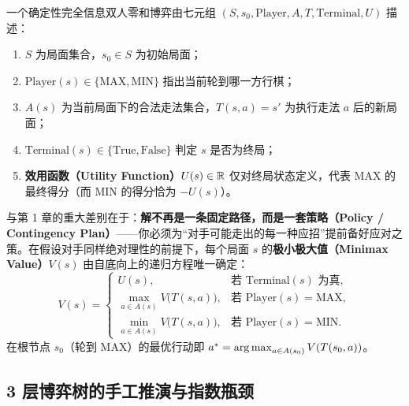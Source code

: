 \begin{defBox}
\begin{definition}[确定性完全信息双人零和博弈]\label{def:game}
一个确定性完全信息双人零和博弈由七元组 $(S, s_0, \text{Player}, A, T, \text{Terminal}, U)$ 描述：
\begin{enumerate}
  \item $S$ 为局面集合，$s_0 \in S$ 为初始局面；
  \item $\text{Player}(s) \in \{\text{MAX}, \text{MIN}\}$ 指出当前轮到哪一方行棋；
  \item $A(s)$ 为当前局面下的合法走法集合，$T(s, a) = s'$ 为执行走法 $a$ 后的新局面；
  \item $\text{Terminal}(s) \in \{\text{True}, \text{False}\}$ 判定 $s$ 是否为终局；
  \item \textbf{效用函数（Utility Function）}$U(s) \in \mathbb{R}$ 仅对终局状态定义，代表 \textsf{MAX} 的最终得分（而 \textsf{MIN} 的得分恰为 $-U(s)$）。
\end{enumerate}
\end{definition}
\end{defBox}

与第 1 章的重大差别在于：\textbf{解不再是一条固定路径，而是一套策略（Policy / Contingency Plan）}——你必须为“对手可能走出的每一种应招”提前备好应对之策。在假设对手同样绝对理性的前提下，每个局面 $s$ 的\textbf{极小极大值（Minimax Value）}$V(s)$ 由自底向上的递归方程唯一确定：
\begin{equation}\label{eq:minimax}
  V(s) =
  \begin{cases}
    U(s), & \text{若 } \text{Terminal}(s) \text{ 为真}, \\[4pt]
    \displaystyle\max_{a \in A(s)} V\bigl(T(s, a)\bigr), & \text{若 } \text{Player}(s) = \text{MAX}, \\[8pt]
    \displaystyle\min_{a \in A(s)} V\bigl(T(s, a)\bigr), & \text{若 } \text{Player}(s) = \text{MIN}.
  \end{cases}
\end{equation}
在根节点 $s_0$（轮到 \textsf{MAX}）的最优行动即 $a^* = \operatorname*{arg\,max}_{a \in A(s_0)} V(T(s_0, a))$。

\subsection{3 层博弈树的手工推演与指数瓶颈}

